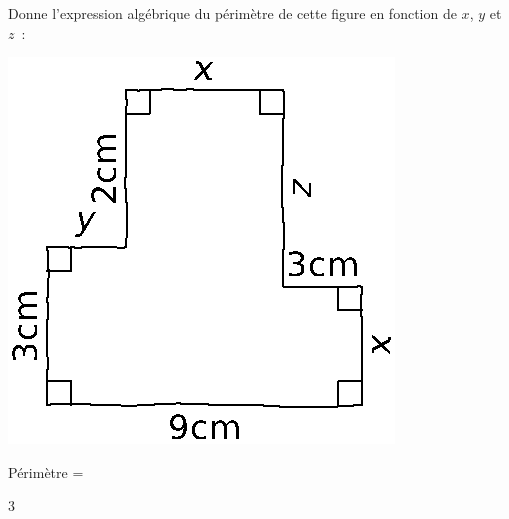 \documentclass[a4paper,11pt]{report}
\begin{document}
\begin{exop}{ 
\begin{minipage}[t]{0.5\textwidth}{
\vspace{0pt}
Donne l'expression algébrique du périmètre de cette figure en fonction de $x$, $y$ et $z$~:
}
\end{minipage}
\begin{minipage}[t]{0.5\textwidth}{
\vspace{0pt}
\begin{center}    
     \includegraphics[scale=0.9]{media/fa-10/calclit}
\end{center}
}
\end{minipage}




Périmètre = \hrulefill
  
}
{3}
\end{exop}
\end{document}
